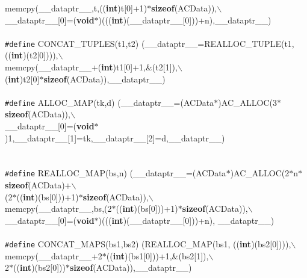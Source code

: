 \begin{flushleft}
\hspace*{28\indentation}memcpy(\_\_dataptr\_\_,t,(({\bf int})t[0]+1)$\ast${\bf sizeof}(ACData)),$\backslash$\\
\hspace*{27\indentation}\_\_dataptr\_\_[0]=({\bf void}$\ast$)((({\bf int})(\_\_dataptr\_\_[0]))+n),\_\_dataptr\_\_)\mbox{}\\
\mbox{}\\
{\tt \#define} CONCAT\_TUPLES(t1,t2) (\_\_dataptr\_\_=REALLOC\_TUPLE(t1, (({\bf int})(t2[0]))),$\backslash$\\
\hspace*{29\indentation}memcpy(\_\_dataptr\_\_+({\bf int})t1[0]+1,\&(t2[1]),$\backslash$\\
\hspace*{29\indentation}({\bf int})t2[0]$\ast${\bf sizeof}(ACData)),\_\_dataptr\_\_)\mbox{}\\
\mbox{}\\
{\tt \#define} ALLOC\_MAP(tk,d) (\_\_dataptr\_\_=(ACData$\ast$)AC\_ALLOC(3$\ast${\bf sizeof}(ACData)),$\backslash$\\
\hspace*{28\indentation}\_\_dataptr\_\_[0]=({\bf void}$\ast$)1,\_\_dataptr\_\_[1]=tk,\_\_dataptr\_\_[2]=d,\_\_dataptr\_\_)\mbox{}\\
\mbox{}\\
\mbox{}\\
{\tt \#define} REALLOC\_MAP(bs,n) (\_\_dataptr\_\_=(ACData$\ast$)AC\_ALLOC(2$\ast$n$\ast${\bf sizeof}(ACData)+$\backslash$\\
\hspace*{30\indentation}(2$\ast$(({\bf int})(bs[0]))+1)$\ast${\bf sizeof}(ACData)),$\backslash$\\
\hspace*{30\indentation}memcpy(\_\_dataptr\_\_,bs,(2$\ast$(({\bf int})(bs[0]))+1)$\ast${\bf sizeof}(ACData)),$\backslash$\\
\hspace*{30\indentation}\_\_dataptr\_\_[0]=({\bf void}$\ast$)((({\bf int})(\_\_dataptr\_\_[0]))+n), \_\_dataptr\_\_)\mbox{}\\
\mbox{}\\
{\tt \#define} CONCAT\_MAPS(bs1,bs2) (REALLOC\_MAP(bs1, (({\bf int})(bs2[0]))),$\backslash$\\
\hspace*{34\indentation}memcpy(\_\_dataptr\_\_+2$\ast$(({\bf int})(bs1[0]))+1,\&(bs2[1]),$\backslash$\\
\hspace*{34\indentation}2$\ast$(({\bf int})(bs2[0]))$\ast${\bf sizeof}(ACData)),\_\_dataptr\_\_)\mbox{}\\

\end{flushleft}
